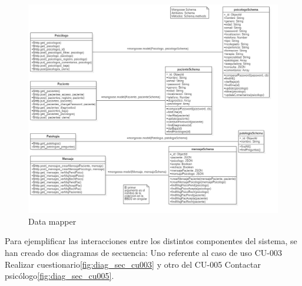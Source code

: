 \begin{landscape}

\begin{figure}[htbp] 
    \centering
    \includegraphics[height=\textwidth,keepaspectratio]{figuras/diagrama/Schema_data_mapper.png}
    \caption{Data mapper}
	    \label{fig:data_mapper}
\end{figure}	

\end{landscape}	


Para ejemplificar las interacciones entre los distintos componentes del sistema, se han creado dos diagramas de secuencia: Uno referente al caso de uso CU-003 Realizar cuestionario\ref{fig:diag_sec_cu003} y otro del CU-005 Contactar psicólogo\ref{fig:diag_sec_cu005}.


